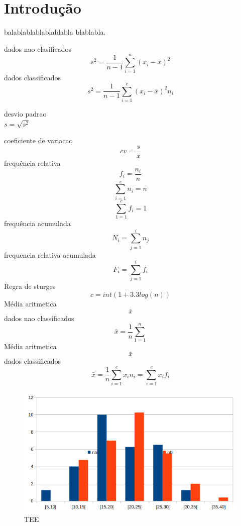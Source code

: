 
%
%
\tableofcontents
%
\appendix
%
\pagestyle{plain}%

\newpage

\section{Introdução}\label{Introdução}

balablablablablablabla blablabla.









dados nao clasificados
\[s^2 = \frac{1}{n-1}\sum_{i=1}^n (x_i-\bar{x})^2\]
dados classificados
\[s^2 = \frac{1}{n-1}\sum_{i=1}^c (x_i-\bar{x})^2 n_i\]

desvio padrao\\

$s = \sqrt{s^2}$

coeficiente de variacao\\
\[cv = \frac{s}{\bar{x}}\]
frequência relativa\\
\[f_i = \frac{n_i}{n}\]
\[\sum_{i=1}^cn_i = n\]
\[\sum_{1=1}^cf_i = 1\]
frequência acumulada\\
\[N_i = \sum_{j=1}^in_j\]
frequencia relativa acumulada\\
\[F_i = \sum_{j=1}^if_i\]
Regra de sturges\\
\[c = int(1+3.3log(n))\]
Média aritmetica \[\bar{x}\] dados nao classificados\\
\[\bar{x} = \frac{1}{n}\sum_{1=1}^n\]
Média aritmetica \[\bar{x}\] dados classificados\\
\[\bar{x} = \frac{1}{n}\sum_{i=1}^cx_in_i = \sum_{i=1}^cx_if_i\]

\begin{figure}[H]
\centering
\includegraphics[scale=1]{./image/first.png}
\caption{TEE}
\label{TEE}
\end{figure}\par

